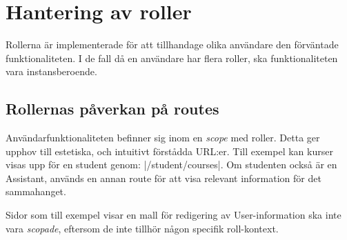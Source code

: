 \section{Hantering av roller}

Rollerna är implementerade för att tillhandage olika användare den förväntade funktionaliteten. I de fall då en användare har flera roller, ska funktionaliteten vara instansberoende.  

\subsection{Rollernas påverkan på routes}
Användarfunktionaliteten befinner sig inom en \emph{scope} med roller. Detta ger upphov till estetiska, och intuitivt förstådda URL:er. Till exempel kan kurser visas upp för en student genom: |/student/courses|. Om studenten också är en Assistant, används en annan route för att visa relevant information för det sammahanget.

Sidor som till exempel visar en mall för redigering av User-information ska inte vara \emph{scopade}, eftersom de inte tillhör någon specifik roll-kontext.
